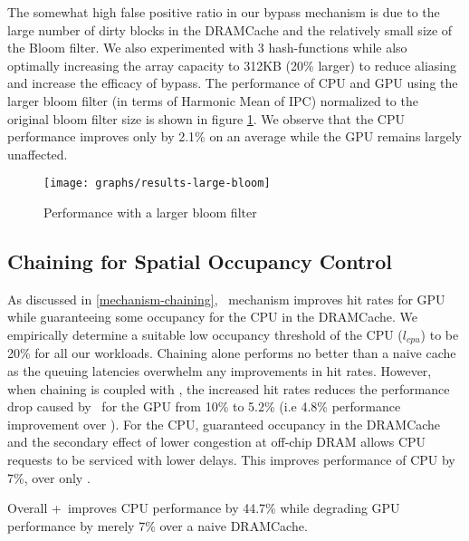 \par The somewhat high false positive ratio in our bypass mechanism is due to the large number of dirty blocks in the DRAMCache and the relatively small size of the Bloom filter.  We also experimented with 3 hash-functions while also optimally increasing the array capacity to 312KB (20\% larger) to reduce aliasing and increase the efficacy of bypass. The performance of CPU and GPU using the larger bloom filter (in terms of Harmonic Mean of IPC) normalized to the original bloom filter size is shown in figure \ref{large-bloom}. We observe that the CPU performance improves only by 2.1\% on an average while the GPU remains largely unaffected.

\begin{figure}[htb]
	\centering
	\texttt{[image: graphs/results-large-bloom]}
	\caption{Performance with a larger bloom filter}
	\label{large-bloom}
\end{figure}

\subsection{Chaining for Spatial Occupancy Control}
As discussed in \ref{mechanism-chaining}, \chaining\ mechanism improves hit rates for GPU while guaranteeing some occupancy for the CPU in the DRAMCache. We empirically determine a suitable low occupancy threshold of the CPU (\textit{$l_{cpu}$}) to be 20\% for all our workloads. Chaining alone performs no better than a naive cache as the queuing latencies overwhelm any improvements in hit rates. However, when chaining is coupled with \prioname, the increased hit rates reduces the performance drop caused by \prioname\ for the GPU from 10\% to 5.2\% (i.e 4.8\% performance improvement over \prioname). For the CPU, guaranteed occupancy in the DRAMCache and the secondary effect of lower congestion at off-chip DRAM allows CPU requests to be serviced with lower delays. This improves performance of CPU by 7\%, over only \prioname.
\par Overall \chaining+\prioname\ improves CPU performance by 44.7\% while degrading GPU performance by merely 7\% over a naive DRAMCache.


